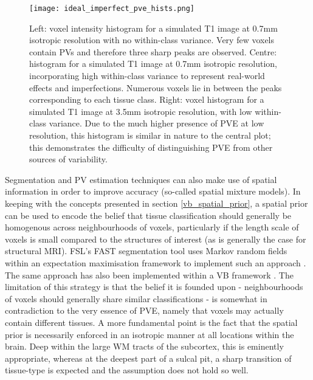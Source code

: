 \begin{figure}
\centering
\texttt{[image: ideal\_imperfect\_pve\_hists.png]}
\caption{Left: voxel intensity histogram for a simulated T1 image at 0.7mm isotropic resolution with no within-class variance. Very few voxels contain PVs and therefore three sharp peaks are observed. Centre: histogram for a simulated T1 image at 0.7mm isotropic resolution, incorporating high within-class variance to represent real-world effects and imperfections. Numerous voxels lie in between the peaks corresponding to each tissue class. Right: voxel histogram for a simulated T1 image at 3.5mm isotropic resolution, with low within-class variance. Due to the much higher presence of PVE at low resolution, this histogram is similar in nature to the central plot; this demonstrates the difficulty of distinguishing PVE from other sources of variability.}
\label{ideal_imperfect_pve_hists}
\end{figure}

Segmentation and PV estimation techniques can also make use of spatial information in order to improve accuracy (so-called spatial mixture models). In keeping with the concepts presented in section \ref{vb_spatial_prior}, a spatial prior can be used to encode the belief that tissue classification should generally be homogenous across neighbourhoods of voxels, particularly if the length scale of voxels is small compared to the structures of interest (as is generally the case for structural MRI). FSL's FAST segmentation tool uses Markov random fields within an expectation maximisation framework to implement such an approach \cite{Zhang2001}. The same approach has also been implemented within a VB framework \cite{Woolrich2006}. The limitation of this strategy is that the belief it is founded upon - neighbourhoods of voxels should generally share similar classifications - is somewhat in contradiction to the very essence of PVE, namely that voxels may actually contain different tissues. A more fundamental point is the fact that the spatial prior is necessarily enforced in an isotropic manner at all locations within the brain. Deep within the large WM tracts of the subcortex, this is eminently appropriate, whereas at the deepest part of a sulcal pit, a sharp transition of tissue-type is expected and the assumption does not hold so well. 

